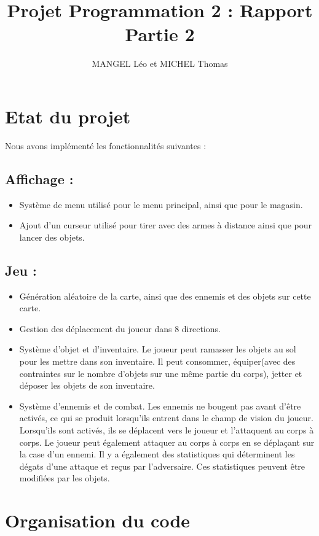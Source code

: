 \documentclass[10pt,a4paper]{article}
\title{Projet Programmation 2 : Rapport Partie 2}
\author{MANGEL Léo et MICHEL Thomas}
\date{}
\begin{document}
\maketitle

\section{Etat du projet}

Nous avons implémenté les fonctionnalités suivantes :

\subsection*{Affichage :}

\begin{itemize}
    \item Système de menu utilisé pour le menu principal, ainsi que pour le magasin.
    \item Ajout d'un curseur utilisé pour tirer avec des armes à distance ainsi que pour lancer des objets.
\end{itemize}

\subsection*{Jeu :}

\begin{itemize}
    \item Génération aléatoire de la carte, ainsi que des ennemis et des objets sur cette carte.
    \item Gestion des déplacement du joueur dans 8 directions.
    \item Système d'objet et d'inventaire. Le joueur peut ramasser les objets au sol pour les mettre dans son inventaire. Il peut consommer, équiper(avec des contraintes sur le nombre d'objets sur une même partie du corps), jetter et déposer les objets de son inventaire.
    \item Système d'ennemis et de combat. Les ennemis ne bougent pas avant d'être activés, ce qui se produit lorsqu'ils entrent dans le champ de vision du joueur. Lorsqu'ils sont activés, ils se déplacent vers le joueur et l'attaquent au corps à corps. Le joueur peut également attaquer au corps à corps en se déplaçant sur la case d'un ennemi. Il y a également des statistiques qui déterminent les dégats d'une attaque et reçus par l'adversaire. Ces statistiques peuvent être modifiées par les objets.
\end{itemize}

\section{Organisation du code}
\end{document}
